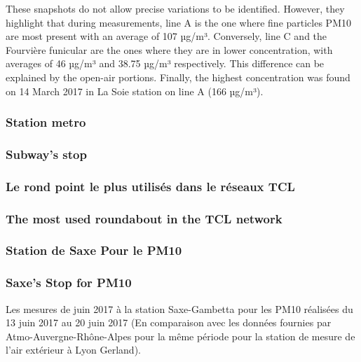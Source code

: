 \documentclass[11pt]{article}
\begin{document}
    These snapshots do not allow precise variations to be identified.
However, they highlight that during measurements, line A is the one
where fine particles PM10 are most present with an average of 107 µg/m³.
Conversely, line C and the Fourvière funicular are the ones where they
are in lower concentration, with averages of 46 µg/m³ and 38.75 µg/m³
respectively. This difference can be explained by the open-air portions.
Finally, the highest concentration was found on 14 March 2017 in La Soie
station on line A (166 µg/m³).

    \hypertarget{station-metro}{%
\subsubsection{Station metro}\label{station-metro}}

\hypertarget{subways-stop}{%
\subsubsection{Subway's stop}\label{subways-stop}}

\hypertarget{le-rond-point-le-plus-utilisuxe9s-dans-le-ruxe9seaux-tcl}{%
\subsubsection{Le rond point le plus utilisés dans le réseaux
TCL}\label{le-rond-point-le-plus-utilisuxe9s-dans-le-ruxe9seaux-tcl}}

\hypertarget{the-most-used-roundabout-in-the-tcl-network}{%
\subsubsection{The most used roundabout in the TCL
network}\label{the-most-used-roundabout-in-the-tcl-network}}

    \hypertarget{station-de-saxe-pour-le-pm10}{%
\subsubsection{Station de Saxe Pour le
PM10}\label{station-de-saxe-pour-le-pm10}}

\hypertarget{saxes-stop-for-pm10}{%
\subsubsection{Saxe's Stop for PM10}\label{saxes-stop-for-pm10}}

    Les mesures de juin 2017 à la station Saxe-Gambetta pour les PM10
réalisées du 13 juin 2017 au 20 juin 2017 (En comparaison avec les
données fournies par Atmo-Auvergne-Rhône-Alpes pour la même période pour
la station de mesure de l'air extérieur à Lyon Gerland).
\end{document}
